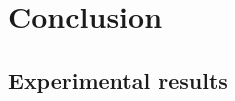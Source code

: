 \documentclass[a4paper,12pt,titlepage,twoside,openany]{book}
\begin{document}
\chapter{Conclusion}
\label{ch:conclusion}


 

\begin{appendices}


    \chapter{Experimental results}
    \label{ch:results_tables}
    

\end{appendices}
\end{document}
